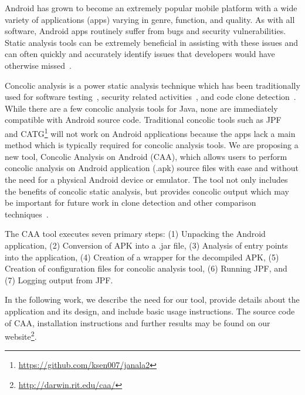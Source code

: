 \documentclass{sig-alternate}
\begin{document}

Android has grown to become an extremely popular mobile platform with a wide variety of applications (apps) varying in genre, function, and quality. As with all software, Android apps routinely suffer from bugs and security vulnerabilities. Static analysis tools can be extremely beneficial in assisting with these issues and can often quickly and accurately identify issues that developers would have otherwise missed~\cite{Ware:2008:SJC:1394504.1394506, Feng:2014:ASD:2635868.2635869}.

Concolic analysis is a power static analysis technique which has been traditionally used for software testing~\cite{Sen:2005:CCU:1081706.1081750}, security related activities~\cite{Chen:2014:CIB:2554850.2554875}, and code clone detection~\cite{Krutz_Sac15, krutz2013code}. While there are a few concolic analysis tools for Java, none are immediately compatible with Android source code. Traditional concolic tools such as JPF~\cite{visser2003model} and CATG\footnote{\url{https://github.com/ksen007/janala2}} will not work on Android applications because the apps lack a main method which is typically required for concolic analysis tools. We are proposing a new tool, Concolic Analysis on Android (CAA), which allows users to perform concolic analysis on Android application (.apk) source files with ease and without the need for a physical Android device or emulator. The tool not only includes the benefits of concolic static analysis, but provides concolic output which may be important for future work in clone detection and other comparison techniques~\cite{Krutz_Sac15, 6671332,Anand:2012:ACT:2393596.2393666}.

The CAA tool executes seven primary steps: (1) Unpacking the Android application, (2) Conversion of APK into a .jar file, (3) Analysis of entry points into the application, (4) Creation of a wrapper for the decompiled APK, (5) Creation of configuration files for concolic analysis tool, (6) Running JPF, and (7) Logging output from JPF.

In the following work, we describe the need for our tool, provide details about the application and its design, and include basic usage instructions. The source code of CAA, installation instructions and further results may be found on our website\footnote{\url{http://darwin.rit.edu/caa/}}.

\end{document}
